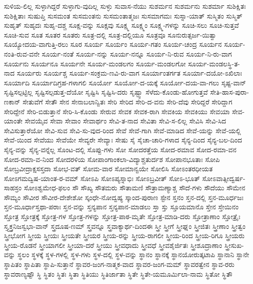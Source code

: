 {ಸುಳಿಯ-ಲಿಲ್ಲ
ಸುಳ್ಳಾಗಿದ್ದರೆ
ಸುಳ್ಳಾಗು-ವುದಿಲ್ಲ
ಸುಳ್ಳು
ಸುವಾಸ-ನೆಯು
ಸುಶರ್ಮನ
ಸುಶರ್ಮನು
ಸುಶರ್ಮಾ
ಸುಶಿಕ್ಷಿತಃ
ಸುಶಿಕ್ಷಿತಾಃ
ಸುಷುಪ್ತಿ
ಸುಸಮಂತ
ಸುಸಮಂತನು
ಸುಸಮಂತಾತ್ಮಜಃ
ಸುಸಮಾಗಮಃ
ಸುಸ್ನಾ-ಯಾತ್
ಸುಸ್ಮಿತಂ
ಸುಸ್ಮಿತ್
ಸುಹೃತ್
ಸುಹೃದಃ
ಸುಹೃ-ದಶ್ಚ
ಸೂಕ್ಷ-ವನ್ನು
ಸೂಕ್ಷವು
ಸೂಕ್ಷ್ಮ
ಸೂಕ್ಷ್ಮಂ
ಸೂಕ್ಷ್ಮ-ಗಳನ್ನು
ಸೂಚಿ-ಸಲು
ಸೂಚಿ-ಸುತ್ತವೆ
ಸೂಚಿ-ಸುವ
ಸೂತ
ಸೂತರ
ಸೂತರು
ಸೂತ್ರ-ದಲ್ಲಿ
ಸೂತ್ರ-ದಲ್ಲಿಯೂ
ಸೂತ್ರವೂ
ಸೂನುರುತ್ಸರ್ಜ-ಯಿತ್ವಾ
ಸೂಯ್ಯೋದಯ-ವಾಗುತ್ತಿ-ರಲು
ಸೂರ
ಸೂರ್ಯ
ಸೂರ್ಯಂ
ಸೂರ್ಯ-ಗತಂ
ಸೂರ್ಯ-ಚಂದ್ರ
ಸೂರ್ಯನ
ಸೂರ್ಯ-ನಂತಿ-ರುವ-ವನೇ
ಸೂರ್ಯ-ನಂತೆ
ಸೂರ್ಯ-ನನ್ನು
ಸೂರ್ಯ-ನನ್ನೂ
ಸೂರ್ಯ-ನಿ-ರುವ
ಸೂರ್ಯ-ನಿ-ರು-ವಾಗ
ಸೂರ್ಯನು
ಸೂರ್ಯನೂ
ಸೂರ್ಯನೇ
ಸೂರ್ಯ-ಮಂಡಲಗಂ
ಸೂರ್ಯ-ಮಂಡಲಗೋ
ಸೂರ್ಯ-ಮಂಡಲಸ್ಥಿ-ತ-ನಾದ
ಸೂರ್ಯರು
ಸೂರ್ಯಶ್ಚ
ಸೂರ್ಯ-ಸಂಕ್ರಮ-ಣವಿ-ರು-ವಾಗ
ಸೂರ್ಯಾಂತರ್ಗತ
ಸೂರ್ಯಾ-ದಯೋ-ಽಖಿಲಾಃ
ಸೂರ್ಯಾದಿ
ಸೂರ್ಯಾದಿಗ್ರಹ-ಗಳಾಗಲಿ
ಸೂರ್ಯೋ
ಸೂರ್ಯೋ-ದ-ಯಕ್ಕೆ
ಸೂರ್ಯೋ-ದಯ-ವಾ-ಗಲು
ಸೃಷ್ಟ-ವಾನ್
ಸೃಷ್ಟಿಸಲ್ಪಟ್ಟಿಲ್ಲ
ಸೃಷ್ಟಿಸಲ್ಪಡುತ್ತ-ದೆಯೋ
ಸೃಷ್ಟಿಸಿ
ಸೃಷ್ಟಿಸಿ-ದರು
ಸೃಷ್ಟ್ವಾ
ಸೆಳೆದು-ಕೊಂಡು-ಹೋಗುತ್ತವೆ
ಸೇತಿ-ಹಾಸ-ಪುರಾ-ಣಕಾನ್
ಸೇತುವೆಗೆ
ಸೇತೌ
ಸೇನ
ಸೇನಾಬಲಾನ್ವಿತಃ
ಸೇರಿ
ಸೇರಿದ
ಸೇರಿ-ದ-ವನು
ಸೇರಿ-ದೆವು
ಸೇರಿದ್ದರೆ
ಸೇರಿದ್ದಾಗ
ಸೇರಿದ್ದೇನೆ
ಸೇರಿ-ಬಿಡುತ್ತಾನೆ
ಸೇರಿ-ಸಿ-ಕೊಂಡು
ಸೇರುವ
ಸೇವಕ
ಸೇವಕ-ರಾಗಿ
ಸೇವಕಿಯ
ಸೇವಕಿಯು
ಸೇವಯಾ
ಸೇವ-ಯಾಂತೇ
ಸೇವಯೈವ
ಸೇವಾ
ಸೇವಾಂ
ಸೇವಾರ್ಥಂ
ಸೇವಿ-ತ-ನಾದ
ಸೇವಿತಾ
ಸೇವಿ-ಸ-ಲಿಲ್ಲ
ಸೇವಿಸಿ
ಸೇವಿ-ಸಿದ
ಸೇವಿಸುತ್ತಾರೆಯೋ
ಸೇವಿ-ಸುವ
ಸೇವಿ-ಸು-ವುದ-ರಿಂದ
ಸೇವೆ
ಸೇವೆ-ಗಾಗಿ
ಸೇವೆ-ಮಾಡಿದ
ಸೇವೆ-ಯನ್ನು
ಸೇವೆ-ಯಲ್ಲಿ
ಸೇವೆ-ಯಿಂದ
ಸೇವೆಯು
ಸೇವೆಯೇ
ಸೇವ್ಯರೇ
ಸೇವ್ಯಾಃ
ಸೇಷು
ಸೈ
ಸೈಚಾ-ಚಾರಿ-ಗಳಾದ
ಸೈನ್ಯ-ದಿಂದ
ಸೈನ್ಯ-ಬಲ-ದಿಂದ
ಸೈನ್ಯ-ವನ್ನು
ಸೈನ್ಯ-ವನ್ನೆಲ್ಲ
ಸೊಂಟ-ದಲ್ಲಿ
ಸೊಪ್ಪು-ಗಳು
ಸೋ
ಸೋದರತ್ತೆಯ
ಸೋದ-ರಮಾವ
ಸೋದ-ರಮಾ-ವನ
ಸೋದ-ರಮಾ-ವ-ನಿಂದ
ಸೋದರಳಿಯ
ಸೋಪಾಂಗಾಂಕಲಾ-ವಿದ್ಯಾಶ್ಚತುರ್ದಶ
ಸೋಪಾನಭೂತಾಃ
ಸೋಪಿ
ಸೋಬ್ರವೀದ್ರಾಕ್ಷಸಸ್ತದಾ
ಸೋಭ-ವತ್
ಸೋಮ-ವಾರ
ಸೋಮಾನ್ವಯೇ
ಸೋಲಿಸಿ
ಸೋಽಂತರಧೀಯತ
ಸೋಽಗಮದ್ವಿಷ-ಯಾಂತ-ರ-ವಮ್
ಸೋಽಪಿ
ಸೋಽಪ್ಯಸ್ನಾಭಿಃ
ಸೋಽಬ್ರವೀತ್
ಸೋಽ-ಭೂತ್
ಸೋಽವಾತ್ಸೀದ್ವರ್ಷ-ಸಾಹಸ್ರಂ
ಸೋಽಶ್ವಮೇಧ-ಫಲಂ
ಸೌ
ಸೌಖ್ಯ
ಸೌತಮರು
ಸೌತಾಮಣಿ
ಸೌತ್ರಾಮಣ್ಯಾಶ್ಚ
ಸೌದೆ-ಗಳು
ಸೌದೆಯು
ಸೌಮೇನ
ಸೌಮ್ಯಂ
ಸೌವೀರ
ಸೌವೀರ-ದೇಶೇಶೋ
ಸ್ಕಂಧೇ-ನೋದ್ವಹ್ಯ
ಸ್ಕಾಂದ-ಪುರಾಣ
ಸ್ಟೇನ
ಸ್ತನಂ
ಸ್ತನ-ದಲ್ಲಿ
ಸ್ತನ-ಮೂರ್ಧಜಃ
ಸ್ತನ-ಮೂರ್ಧಾಸ್ತಥಾ-ಪರಾಃ
ಸ್ತನ-ವನ್ನು
ಸ್ತನ್ಯಪಾನ
ಸ್ತನ್ಯಪಾನ-ಮಾಡಲು
ಸ್ತಾ
ಸ್ತು
ಸ್ತೂಯಮಾನೊ
ಸ್ತೇನ
ಸ್ತೇಯಿನಂ
ಸ್ತೋತ್ರ
ಸ್ತೋತ್ರಕ್ಕೆ
ಸ್ತೋತ್ರ-ಗಳ
ಸ್ತೋತ್ರ-ಗಳನ್ನು
ಸ್ತೋತ್ರ-ಪಾಠ-ಮೃತೇ
ಸ್ತೋತ್ರ-ಮಾಡಿ-ದರು
ಸ್ತೋತ್ರಾಣಾಂ
ಸ್ತೋತ್ರೈಃ
ಸ್ತ್ಯ್ತಕ್ತನಿಜಸ್ವಭಾ-ವಾನ್
ಸ್ತ್ರದೂಷ-ಣಮ್
ಸ್ತ್ರವನ್ನೂ
ಸ್ತ್ರವಾಕ್ಯಾರ್ಥ-ದಿಂದಈ
ಸ್ತ್ರೀ
ಸ್ತ್ರೀಗೆ
ಸ್ತ್ರೀಘ್ನಂ
ಸ್ತ್ರೀಜಿತಃ
ಸ್ತ್ರೀಣಾಂ
ಸ್ತ್ರೀತ್ವಂ
ಸ್ತ್ರೀಭೋಗ
ಸ್ತ್ರೀಯ
ಸ್ತ್ರೀಯಃ
ಸ್ತ್ರೀಯತೇ
ಸ್ತ್ರೀಯರ
ಸ್ತ್ರೀಯ-ರನ್ನು
ಸ್ತ್ರೀಯ-ರಾಗಲೀ
ಸ್ತ್ರೀಯ-ರಿಂದ
ಸ್ತ್ರೀಯ-ರಿಗೂ
ಸ್ತ್ರೀಯರು
ಸ್ತ್ರೀಯ-ರೊಡನೆ
ಸ್ತ್ರೀಯಾಗಲೀ
ಸ್ತ್ರೀಯಾ-ದರೆ
ಸ್ತ್ರೀಯು
ಸ್ತ್ರೀವಧಾದು
ಸ್ತ್ರೀವಧೆ
ಸ್ತ್ರೀವಶೈರ್ಜಿತಃ
ಸ್ತ್ರೀಶೂದ್ರಾಣಾಂ
ಸ್ತ್ರೀಸುಖ-ವನ್ನು
ಸ್ಥಲಂ
ಸ್ಥಳಕ್ಕೆ
ಸ್ಥಳ-ಗಳಲ್ಲಿ
ಸ್ಥಳ-ಗಳು
ಸ್ಥಳ-ದಲ್ಲಿ
ಸ್ಥಳ-ವನ್ನು
ಸ್ಥಾನಂ
ಸ್ಥಾನಕ್ಕೆ
ಸ್ಥಾನಯೋರುತ್ಕಟಾಪಿ
ಸ್ಥಾನಾನಿ
ಸ್ಥಾನೇ
ಸ್ಥಾಪಿತಂ
ಸ್ಥಾಪಿತಾ
ಸ್ಥಾಪಿ-ಸುತ್ತಾನೆ
ಸ್ಥಾವರ-ಜಂಗ-ನಾತ್ಮಕ-ವಾದ
ಸ್ಥಾವರ-ಜಂಗ-ಮಮ್
ಸ್ಥಾವರತ್ವೇನ
ಸ್ಥಾವ-ರರು
ಸ್ಥಾವರಾಣ್ಯಷ್ಟೌ
ಸ್ಥಿ
ಸ್ಥಿತಂ
ಸ್ಥಿತಃ
ಸ್ಥಿತಾ
ಸ್ಥಿತಿಯು
ಸ್ಥಿತಿರ್ಜಾತಾ
ಸ್ಥಿತೇ
ಸ್ಥಿತೇ-ಯಮೂರ್ಮಿಲಾ-ನಾಮ
ಸ್ಥಿತೋ
ಸ್ಥಿತೌ
}

